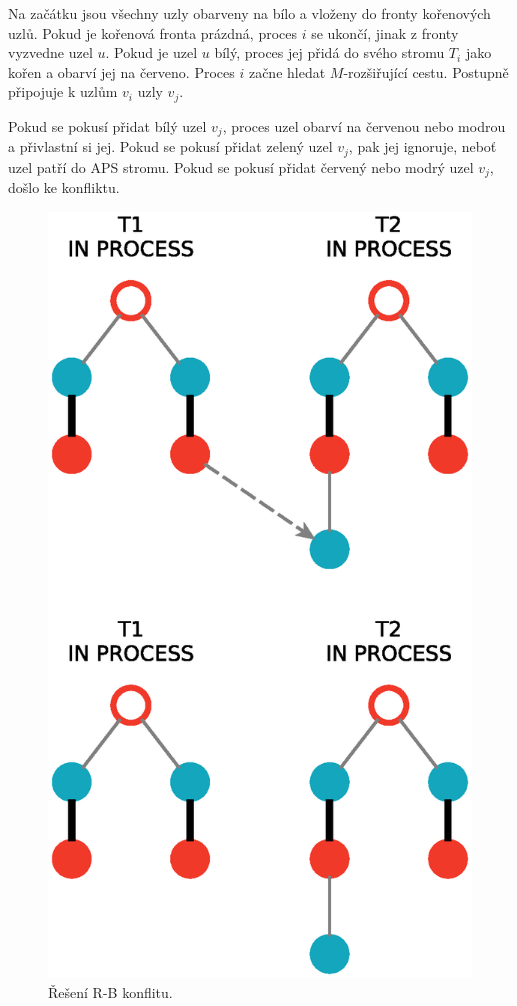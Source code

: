 \documentclass[a4paper, 11pt, titlepage, final]{article}[3. prosinec 2011]
\begin{document}
Na začátku jsou všechny uzly obarveny na bílo a vloženy do fronty kořenových uzlů. Pokud je kořenová fronta prázdná, proces $i$ se ukončí, jinak z fronty vyzvedne uzel $u$. Pokud je uzel $u$ bílý, proces jej přidá do svého stromu $T_i$ jako kořen a obarví jej na červeno. Proces $i$ začne hledat $M$-rozšiřující cestu. Postupně připojuje k uzlům $v_i$ uzly $v_j$. 

Pokud se pokusí přidat bílý uzel $v_j$, proces uzel obarví na červenou nebo modrou a přivlastní si jej. Pokud se pokusí přidat zelený uzel $v_j$, pak jej ignoruje, neboť uzel patří do APS stromu. Pokud se pokusí přidat červený nebo modrý uzel $v_j$, došlo ke konfliktu. 

\begin{figure}[ht]
  \centering
  \includegraphics[scale=0.5]{img/inconflict.eps}
  \caption{Řešení R-B konflitu.}
  \label{imgConflict}
\end{figure}
\end{document}
